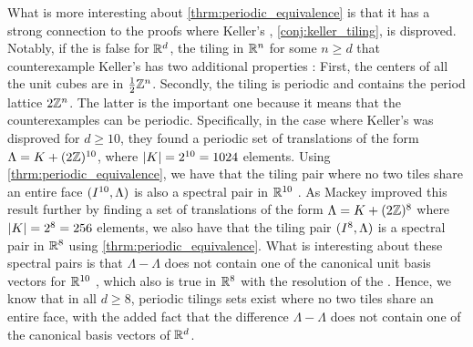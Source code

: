 \documentclass[../thesis.tex]{subfiles}
\begin{document}
What is more interesting about \cref{thrm:periodic_equivalence} is that it has a strong connection to the proofs where Keller's , \cref{conj:keller_tiling}, is disproved. Notably, if the  is false for $\mathbb{R}^d$, the tiling in $\mathbb{R}^n$ for some $n\geq d$ that counterexample Keller's  has two additional properties \cite{lagariasKellerCubetilingConjecture1992}: First, the centers of all the unit cubes are in $\frac{1}{2}\mathbb{Z}^n$. Secondly, the tiling is periodic and contains the period lattice $2\mathbb{Z}^n$. The latter is the important one because it means that the counterexamples can be periodic. Specifically, in the case where Keller's  was disproved for $d\geq10$, they found a periodic set of translations of the form $\Lambda= K + (2\mathbb{Z})^{10}$, where $|K| = 2^{10} = 1024$ elements. Using \cref{thrm:periodic_equivalence}, we have that the tiling pair where no two tiles share an entire face $(I^{10},\Lambda)$ is also a spectral pair in $\mathbb{R}^{10}$ \cite{jorgensenSpectralPairsCartesian2001}. As Mackey \cite{mackeyCubeTilingDimension2002} improved this result further by finding a set of translations of the form $\Lambda= K + (2\mathbb{Z})^{8}$ where $|K| = 2^{8} = 256$ elements, we also have that the tiling pair $(I^{8},\Lambda)$ is a spectral pair in $\mathbb{R}^8$ using \cref{thrm:periodic_equivalence}. What is interesting about these spectral pairs is that $\Lambda-\Lambda$ does not contain one of the canonical unit basis vectors for $\mathbb{R}^{10}$ \cite{jorgensenSpectralPairsCartesian2001}, which also is true in $\mathbb{R}^{8}$ with the resolution of the  \cite{brakensiekResolutionKellerConjecture2020}. Hence, we know that in all $d\geq8$, periodic tilings sets exist where no two tiles share an entire face, with the added fact that the difference $\Lambda-\Lambda$ does not contain one of the canonical basis vectors of $\mathbb{R}^d$.
\begin{remark}
\end{remark}
\end{document}
